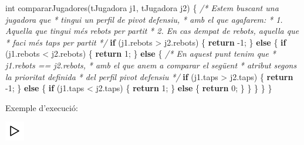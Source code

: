 \documentclass[]{book}
\newenvironment{Shaded}{\begin{snugshade}}{\end{snugshade}}
\newcommand{\CommentTok}[1]{\textcolor[rgb]{0.56,0.35,0.01}{\textit{#1}}}
\newcommand{\ControlFlowTok}[1]{\textcolor[rgb]{0.13,0.29,0.53}{\textbf{#1}}}
\newcommand{\DataTypeTok}[1]{\textcolor[rgb]{0.13,0.29,0.53}{#1}}
\newcommand{\DecValTok}[1]{\textcolor[rgb]{0.00,0.00,0.81}{#1}}
\newcommand{\NormalTok}[1]{#1}
\begin{document}
\begin{Shaded}
\begin{Highlighting}[]
\DataTypeTok{int}\NormalTok{ compararJugadores(tJugadora j1, tJugadora j2) \{}
    \CommentTok{/* Estem buscant una jugadora que }
\CommentTok{     * tingui un perfil de pivot defensiu, }
\CommentTok{     * amb el que agafarem:}
\CommentTok{     * 1. Aquella que tingui més rebots per partit}
\CommentTok{     * 2. En cas d\textquotesingle{}empat de rebots, aquella que}
\CommentTok{     * faci més taps per partit}
\CommentTok{     */} 
    \ControlFlowTok{if}\NormalTok{ (j1.rebots \textgreater{} j2.rebots) \{}
        \ControlFlowTok{return}\NormalTok{ {-}}\DecValTok{1}\NormalTok{;}
\NormalTok{    \} }\ControlFlowTok{else}\NormalTok{ \{}
        \ControlFlowTok{if}\NormalTok{ (j1.rebots \textless{} j2.rebots) \{}
            \ControlFlowTok{return} \DecValTok{1}\NormalTok{;}
\NormalTok{        \} }\ControlFlowTok{else}\NormalTok{ \{}
            \CommentTok{/* En aquest punt tenim que }
\CommentTok{             * j1.rebots == j2.rebots,}
\CommentTok{             * amb el que anem a comparar el següent}
\CommentTok{             * atribut segons la prioritat definida}
\CommentTok{             * del perfil pivot defensiu}
\CommentTok{             */}
            \ControlFlowTok{if}\NormalTok{ (j1.taps \textgreater{} j2.taps) \{}
                \ControlFlowTok{return}\NormalTok{ {-}}\DecValTok{1}\NormalTok{;}
\NormalTok{            \} }\ControlFlowTok{else}\NormalTok{ \{}
                \ControlFlowTok{if}\NormalTok{ (j1.taps \textless{} j2.taps) \{}
                    \ControlFlowTok{return} \DecValTok{1}\NormalTok{;}
\NormalTok{                \} }\ControlFlowTok{else}\NormalTok{ \{}
                    \ControlFlowTok{return} \DecValTok{0}\NormalTok{;}
\NormalTok{                \}}
\NormalTok{            \}}
\NormalTok{        \}}
\NormalTok{    \}}
\NormalTok{\}}
\end{Highlighting}
\end{Shaded}

Exemple d'execució:

\includegraphics{./img/play.png}
\end{document}
